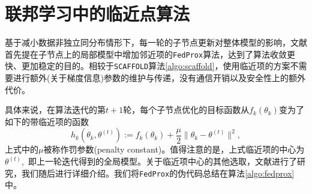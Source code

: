 \section{联邦学习中的临近点算法}
\label{sec:chap2-ppa}

基于减小数据非独立同分布情形下，每一轮的子节点更新对整体模型的影响，文献\parencite{sahu2018fedprox}首先提在子节点上的局部模型中增加邻近项的\texttt{FedProx}算法，达到了算法收敛更快、更加稳定的目的。相较于\texttt{SCAFFOLD}算法\ref{algo:scaffold}，使用临近项的方案不需要进行额外(关于梯度信息)参数的维护与传递，没有通信开销以及安全性上的额外代价。

具体来说，在算法迭代的第$t+1$轮，每个子节点优化的目标函数从$f_k(\theta_k)$变为了如下的带临近项的函数
\begin{equation}
\label{eq:fedprox}
h_k(\theta_k, \theta^{(t)}) := f_k(\theta_k) + \frac{\mu}{2} \lVert \theta_k - \theta^{(t)} \rVert^2,
\end{equation}
上式中的$\mu$被称作罚参数(penalty constant)。值得注意的是，上式临近项的中心为$\theta^{(t)},$ 即上一轮迭代得到的全局模型。关于临近项中心的其他选取，文献\parencite{hanzely2020federated,li_2021_ditto}进行了研究，我们随后进行详细介绍。我们将\texttt{FedProx}的伪代码总结在算法\ref{algo:fedprox}中。



